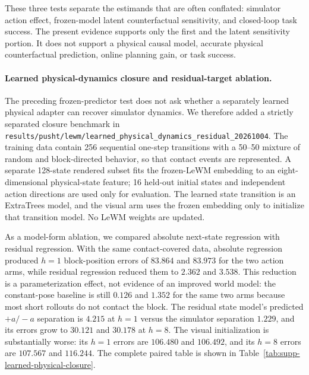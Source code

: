 \documentclass{article}
\begin{document}
These three tests separate the estimands that are often conflated: simulator
action effect, frozen-model latent counterfactual sensitivity, and closed-loop
task success.  The present evidence supports only the first and the latent
sensitivity portion.  It does not support a physical causal model, accurate
physical counterfactual prediction, online planning gain, or task success.

\paragraph{Learned physical-dynamics closure and residual-target ablation.}
The preceding frozen-predictor test does not ask whether a separately learned
physical adapter can recover simulator dynamics. We therefore added a
strictly separated closure benchmark in
\texttt{results/pusht/lewm/learned\_physical\_dynamics\_residual\_20261004}.
The training data contain 256 sequential one-step transitions with a 50--50
mixture of random and block-directed behavior, so that contact events are
represented. A separate 128-state rendered subset fits the frozen-LeWM
embedding to an eight-dimensional physical-state feature; 16 held-out initial
states and independent action directions are used only for evaluation. The
learned state transition is an ExtraTrees model, and the visual arm uses the
frozen embedding only to initialize that transition model. No LeWM weights are
updated.

As a model-form ablation, we compared absolute next-state regression with
residual regression. With the same contact-covered data, absolute regression
produced $h=1$ block-position errors of $83.864$ and $83.973$ for the two
action arms, while residual regression reduced them to $2.362$ and $3.538$.
This reduction is a parameterization effect, not evidence of an improved world
model: the constant-pose baseline is still $0.126$ and $1.352$ for the same
two arms because most short rollouts do not contact the block. The residual
state model's predicted $+a/-a$ separation is $4.215$ at $h=1$ versus the
simulator separation $1.229$, and its errors grow to $30.121$ and $30.178$ at
$h=8$. The visual initialization is substantially worse: its $h=1$ errors
are $106.480$ and $106.492$, and its $h=8$ errors are $107.567$ and
$116.244$. The complete paired table is shown in
Table~\ref{tab:supp-learned-physical-closure}.
\end{document}
